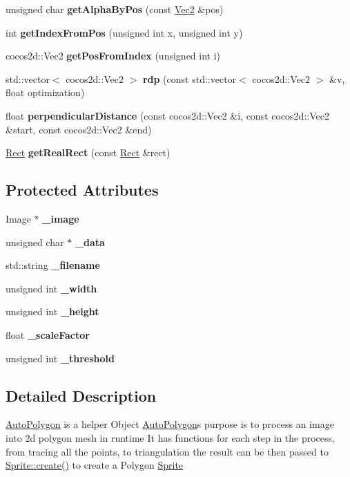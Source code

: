 \begin{DoxyCompactItemize}
\item 
\mbox{\label{classAutoPolygon_ga94fbeedbd00cf4b73119eaca2a7029d2}} 
unsigned char {\bfseries get\+Alpha\+By\+Pos} (const \hyperlink{classVec2}{Vec2} \&pos)
\item 
int {\bfseries get\+Index\+From\+Pos} (unsigned int x, unsigned int y)
\item 
cocos2d\+::\+Vec2 {\bfseries get\+Pos\+From\+Index} (unsigned int i)
\item 
\mbox{\label{classAutoPolygon_ga6046bd3ba1552bac9f5e334b82c57a41}} 
std\+::vector$<$ cocos2d\+::\+Vec2 $>$ {\bfseries rdp} (const std\+::vector$<$ cocos2d\+::\+Vec2 $>$ \&v, float optimization)
\item 
\mbox{\label{classAutoPolygon_gab3bf552fad7983845509c2fcd879c938}} 
float {\bfseries perpendicular\+Distance} (const cocos2d\+::\+Vec2 \&i, const cocos2d\+::\+Vec2 \&start, const cocos2d\+::\+Vec2 \&end)
\item 
\mbox{\label{classAutoPolygon_ga8cce31e647cd6a216252ad8e14f8ffce}} 
\hyperlink{classRect}{Rect} {\bfseries get\+Real\+Rect} (const \hyperlink{classRect}{Rect} \&rect)
\end{DoxyCompactItemize}
\subsection*{Protected Attributes}
\begin{DoxyCompactItemize}
\item 
Image $\ast$ {\bfseries \+\_\+image}
\item 
unsigned char $\ast$ {\bfseries \+\_\+data}
\item 
std\+::string {\bfseries \+\_\+filename}
\item 
unsigned int {\bfseries \+\_\+width}
\item 
unsigned int {\bfseries \+\_\+height}
\item 
float {\bfseries \+\_\+scale\+Factor}
\item 
unsigned int {\bfseries \+\_\+threshold}
\end{DoxyCompactItemize}


\subsection{Detailed Description}
\hyperlink{classAutoPolygon}{Auto\+Polygon} is a helper Object \hyperlink{classAutoPolygon}{Auto\+Polygon}\textquotesingle{}s purpose is to process an image into 2d polygon mesh in runtime It has functions for each step in the process, from tracing all the points, to triangulation the result can be then passed to \hyperlink{classSprite_a6b7ca689b01646e2c58a9ffae3683413}{Sprite\+::create()} to create a Polygon \hyperlink{classSprite}{Sprite} 

